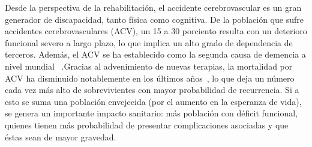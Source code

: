 \begin{introduction}
    Desde la perspectiva de la rehabilitación, el accidente cerebrovascular 
    es un gran generador de discapacidad, tanto física como cognitiva. De la población que sufre 
    accidentes cerebrovasculares (ACV), un 15 a 30 porciento resulta con un deterioro funcional severo a 
    largo plazo, lo que implica un alto grado de dependencia de terceros. Además, el ACV se ha
    establecido como la segunda causa de demencia a nivel mundial~\cite{moyano2010accidente} .Gracias 
    al advenimiento de nuevas terapias, la mortalidad por ACV ha disminuido notablemente en los últimos 
    años~\cite{cuadrado2009rehabilitacion,harold2007guidelines}, lo que deja un número cada vez más 
    alto de sobrevivientes con mayor probabilidad de recurrencia. Si a esto se suma una población 
    envejecida (por el aumento en la esperanza de vida), se genera un importante impacto sanitario: 
    más población con déficit funcional, quienes tienen más probabilidad de presentar complicaciones 
    asociadas y que éstas sean de mayor gravedad.


\end{introduction}
